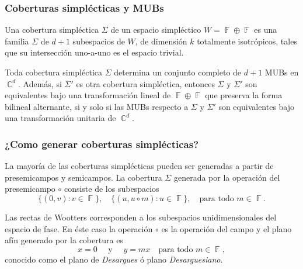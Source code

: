 \documentclass[10pt, spanish]{beamer}
\DeclareMathOperator{\C}{\mathbb{C}}
\DeclareMathOperator{\F}{\mathbb{F}}
\begin{document}
  \begin{frame}
    \frametitle{Coberturas simplécticas y MUBs}

    \begin{definition}
      Una cobertura simpléctica $\Sigma$ de un espacio
      simpléctico $W = \F \oplus \F$ es una familia $\Sigma$ 
      de $d+1$ subespacios de $W$, de dimensión $k$ 
      totalmente isotrópicos, tales que su intersección
      uno-a-uno es el espacio trivial.
    \end{definition}

    \pause

    \begin{theorem}[Kantor, 2.3]
      Toda cobertura simpléctica $\Sigma$ determina un
      conjunto completo de $d+1$ MUBs en $\C^{d}$. Además,
      si $\Sigma'$ es otra cobertura simpléctica, entonces
      $\Sigma$ y $\Sigma'$ son equivalentes bajo una
      transformación lineal de $\F \oplus \F$ que preserva
      la forma bilineal alternante, si y solo si las MUBs
      respecto a $\Sigma$ y $\Sigma'$ son equivalentes bajo
      una transformación unitaria de $\C^{d}$.
    \end{theorem}
  \end{frame}

  \begin{frame}
    \frametitle{¿Como generar coberturas simplécticas?}

    La mayoría de las coberturas simplécticas pueden ser
    generadas a partir de presemicampos y semicampos. La
    cobertura $\Sigma$ generada por la operación del presemicampo
    $\circ$ consiste de los subespacios 
    \begin{equation}
      \{(0,v) : v \in \F\},
      \quad
      \{(u,u\circ m) : u \in \F\},
      \quad \text{para todo } m \in \F.
    \end{equation}

    \vspace{10pt}

    \begin{example}
      Las rectas de Wootters corresponden a los subespacios
      unidimensionales del espacio de fase. En éste caso la
      operación $\circ$ es la operación del campo y el plano
      afín generado por la cobertura es
      \begin{equation}
        x = 0
        \quad
        \text{ y }
        \quad
        y = mx
        \quad \text{para todo } m \in \F,
      \end{equation}
      conocido como el plano de \textit{Desargues} ó plano
      \textit{Desarguesiano}.
    \end{example}
  \end{frame}
\end{document}
